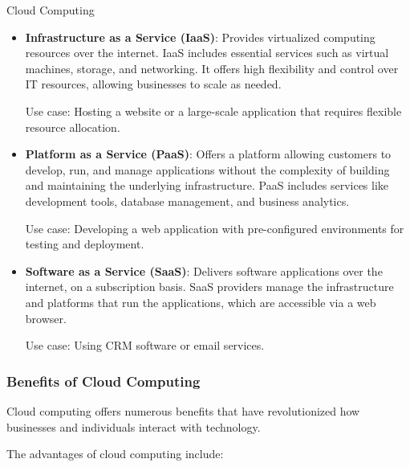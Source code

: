 \begin{notes}{Cloud Computing}
\begin{highlight}
        \begin{itemize}
            \item \textbf{Infrastructure as a Service (IaaS)}: Provides virtualized computing resources over the internet. IaaS includes essential services such as virtual machines, storage, and networking. 
            It offers high flexibility and control over IT resources, allowing businesses to scale as needed.
            \begin{code}[Example]
            Use case: Hosting a website or a large-scale application that requires flexible resource allocation.
            \end{code}
            \item \textbf{Platform as a Service (PaaS)}: Offers a platform allowing customers to develop, run, and manage applications without the complexity of building and maintaining the underlying 
            infrastructure. PaaS includes services like development tools, database management, and business analytics.
            \begin{code}[Example]
            Use case: Developing a web application with pre-configured environments for testing and deployment.
            \end{code}
            \item \textbf{Software as a Service (SaaS)}: Delivers software applications over the internet, on a subscription basis. SaaS providers manage the infrastructure and platforms that run the 
            applications, which are accessible via a web browser.
            \begin{code}[Example]
            Use case: Using CRM software or email services.
            \end{code}
        \end{itemize}
    
    \end{highlight}
    
    \subsubsection*{Benefits of Cloud Computing}
    
    Cloud computing offers numerous benefits that have revolutionized how businesses and individuals interact with technology.
    
    \begin{highlight}
    
        The advantages of cloud computing include:
        

\end{highlight}
\end{notes}
